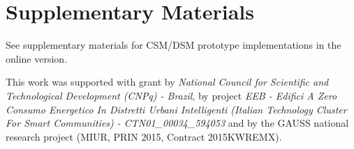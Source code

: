 \documentclass[format=acmsmall, review=false, screen=false]{acmart}
\begin{document}
	\section{Supplementary Materials}	
	
	\begin{printonly}
	  See supplementary materials for CSM/DSM prototype implementations in the online version.
	\end{printonly}
	
	\begin{screenonly}
	
	
	  
	\end{screenonly}
	
	\begin{acks}
	
	This work was supported with grant by \textit{National Council for Scientific and Technological Development (CNPq) - Brazil},  by project \textit{EEB - Edifici A Zero Consumo Energetico In Distretti Urbani Intelligenti (Italian Technology Cluster For Smart Communities) - CTN01\_00034\_594053} and by the GAUSS national research project (MIUR, PRIN 2015, Contract 2015KWREMX).
	
	\end{acks}
	
	
	
	
\end{document}
